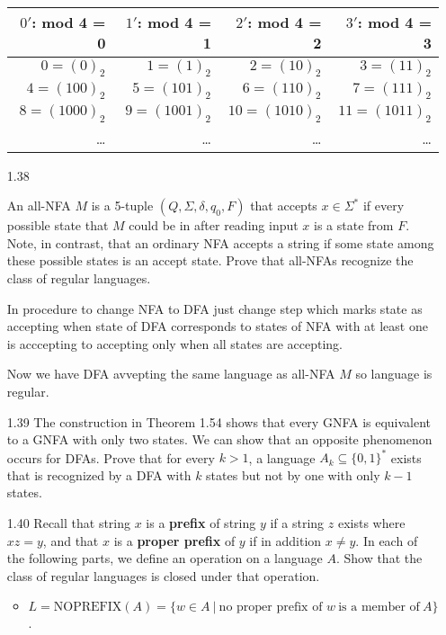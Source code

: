 \begin{enumerate}
          \begin{table}[H]
              \centering
              \begin{tabular}{|r|r|r|r|}
                  \hline
                  $0'$: mod 4 = 0 & $1'$: mod  4 = 1 & $2'$: mod 4 = 2 & $3'$: mod 4 = 3 \\
                  \hline
                  $0 = (0)_2$     & $1 = (1)_2$      & $2 = (10)_2$    & $3 = (11)_2$    \\
                  $4 = (100)_2$   & $5 = (101)_2$    & $6 = (110)_2$   & $7 = (111)_2$   \\
                  $8 = (1000)_2$  & $9 = (1001)_2$   & $10 = (1010)_2$ & $11 = (1011)_2$ \\
                  \ldots          & \ldots           & \ldots          & \ldots          \\
                  \hline
              \end{tabular}
          \end{table}

    \item [1.38]

          An all-NFA $M$ is a 5-tuple $(Q,\Sigma,\delta,q_0,F)$ that accepts $x \in \Sigma^\ast$ if every possible state that $M$ could be in after reading input $x$ is a state from $F$. Note, in contrast, that an ordinary NFA accepts a string if some state among these possible states is an accept state. Prove that all-NFAs recognize the class of regular languages.

          In procedure to change NFA to DFA just change step which marks state as accepting when state of DFA corresponds to states of NFA with at least one is acccepting to accepting only when all states are accepting.

          Now we have DFA avvepting the same language as all-NFA $M$ so language is regular.
    \item [1.39]
          The construction in Theorem 1.54 shows that every GNFA is equivalent to a GNFA with only two states. We can show that an opposite phenomenon occurs for DFAs. Prove that for every $k > 1$, a language $A_k \subseteq \{0,1\}^\ast$ exists that is recognized by a DFA with $k$ states but not by one with only $k-1$ states.
    \item [1.40]
          Recall that string $x$ is a \textbf{prefix} of string $y$ if a string $z$ exists where $xz = y$, and that $x$ is a \textbf{proper prefix} of $y$ if in addition $x \neq y$. In each of the following parts, we define an operation on a language $A$. Show that the class of regular languages is closed under that operation.
          \begin{itemize}
              \item $L = \text{NOPREFIX}(A)=\{w \in A~|~\text{no proper prefix of } w~ \text{is a member of}~ A\}$.


\end{itemize}
\end{enumerate}
